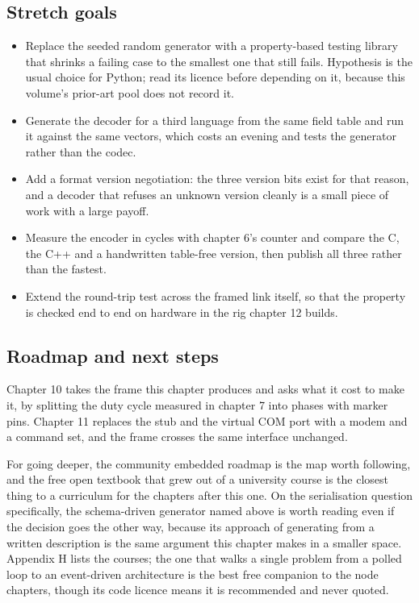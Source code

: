 \subsection*{Stretch goals}

\begin{itemize}
\item Replace the seeded random generator with a property-based testing library
that shrinks a failing case to the smallest one that still fails. Hypothesis is
the usual choice for Python; read its licence before depending on it, because
this volume's prior-art pool does not record it.
\item Generate the decoder for a third language from the same field table and
run it against the same vectors, which costs an evening and tests the generator
rather than the codec.
\item Add a format version negotiation: the three version bits exist for that
reason, and a decoder that refuses an unknown version cleanly is a small piece of
work with a large payoff.
\item Measure the encoder in cycles with chapter 6's counter and compare the C,
the C++ and a handwritten table-free version, then publish all three rather than
the fastest.
\item Extend the round-trip test across the framed link itself, so that the
property is checked end to end on hardware in the rig chapter 12 builds.
\end{itemize}

\subsection*{Roadmap and next steps}

Chapter 10 takes the frame this chapter produces and asks what it cost to make
it, by splitting the duty cycle measured in chapter 7 into phases with marker
pins. Chapter 11 replaces the stub and the virtual COM port with a modem and a
command set, and the frame crosses the same interface unchanged.

For going deeper, the community embedded roadmap is the map worth following,
and the free open textbook that grew out of a university course is the closest
thing to a curriculum for the chapters after this one. On the serialisation
question specifically, the schema-driven generator named above is worth reading
even if the decision goes the other way, because its approach of generating from
a written description is the same argument this chapter makes in a smaller
space. Appendix H lists the courses; the one that walks a single problem from a
polled loop to an event-driven architecture is the best free companion to the
node chapters, though its code licence means it is recommended and never quoted.

